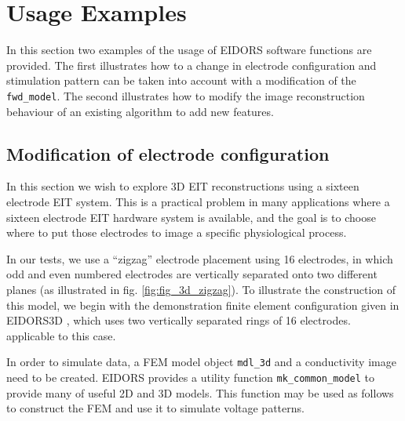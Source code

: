 \documentclass[12pt]{iopart}
\begin{document}
\section{ Usage Examples}

In this section two examples of the usage of EIDORS
software functions are provided. The first illustrates
how to a change in electrode configuration and stimulation 
pattern can be taken
into account with a modification of the {\tt fwd\_model}.
The second illustrates how to modify the image reconstruction
behaviour of an existing algorithm to
add new features.

\subsection{Modification of electrode configuration}

In this section we wish to explore 3D EIT reconstructions
using a sixteen electrode EIT system. This is a practical
problem in many applications where a sixteen electrode
EIT hardware system is available, and the goal is to 
choose where to put those electrodes to image a specific
physiological process.

In our tests, we use a ``zigzag'' electrode placement 
using 16 electrodes, in which odd and even numbered
electrodes are vertically separated onto two different
planes (as illustrated in fig. \ref{fig:fig_3d_zigzag}).
To illustrate the construction of this model, we begin
with the demonstration finite element configuration
given in EIDORS3D \cite{Polydorides_and_Lionheart_2002},
which uses two vertically separated rings of 16 electrodes.
applicable to this case.

In order to simulate data, a FEM model object {\tt mdl\_3d}
and a conductivity image need to be created.
EIDORS provides a utility function {\tt mk\_common\_model}
to provide many of useful 2D and 3D models. This function
may be used as follows to construct the FEM and use it
to simulate voltage patterns.
\end{document}
